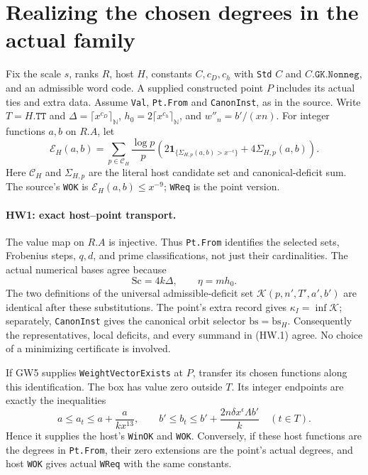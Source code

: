 \section{Realizing the chosen degrees in the actual family}
\label{sec:host-weight-join}


Fix the scale $s$, ranks $R$, host $H$, constants $C,c_D,c_h$ with
\texttt{Std} $C$ and $C.\texttt{GK.Nonneg}$, and an
admissible word code. A supplied constructed point $P$ includes its actual
ties and extra data. Assume \texttt{Val}, \texttt{Pt.From} and
\texttt{CanonInst}, as in the source. Write $T=H.\texttt{TT}$ and
$\Delta=\lceil x^{c_D}\rceil_{\mathbb N}$,
$h_0=2\lceil x^{c_h}\rceil_{\mathbb N}$, and $w''_n=b'/(xn)$.
For integer functions $a,b$ on $R.A$, let
\[
 \mathcal E_H(a,b)=
 \sum_{p\in\mathcal C_H}\frac{\log p}{p}
 \left(2\mathbf1_{\{\Sigma_{H,p}(a,b)>x^{-\epsilon}\}}
       +4\Sigma_{H,p}(a,b)\right).                 \tag{HW.1}
\]
Here $\mathcal C_H$ and $\Sigma_{H,p}$ are the literal host candidate
set and canonical-deficit sum. The source's \texttt{WOK} is
$\mathcal E_H(a,b)\le x^{-9}$; \texttt{WReq} is the point version.

\paragraph{HW1: exact host--point transport.}
The value map on $R.A$ is injective. Thus \texttt{Pt.From} identifies
the selected sets, Frobenius steps, $q,d$, and prime classifications,
not just their cardinalities. The actual numerical bases agree because
\[
 \mathrm{Sc}=4k\Delta,\qquad \eta=mh_0.             \tag{HW.2}
\]
The two definitions of the universal admissible-deficit set
$\mathcal K(p,n',T',a',b')$ are identical after these substitutions.
The point's extra record gives
$\kappa_I=\inf\mathcal K$; separately, \texttt{CanonInst} gives the
canonical orbit selector $\mathrm{bs}=\mathrm{bs}_H$.
Consequently the representatives, local deficits, and every summand in
(HW.1) agree. No choice of a minimizing certificate is involved.

If GW5 supplies \texttt{WeightVectorExists} at $P$, transfer its chosen
functions along this identification. The box has value zero outside
$T$. Its integer endpoints are exactly the inequalities
\[
 a\le a_t\le a+\frac{a}{kx^{13}},\qquad
 b'\le b_t\le b'+\frac{2n\delta x^\epsilon\Lambda b'}k
 \quad(t\in T).                                  \tag{HW.3}
\]
Hence it supplies the host's \texttt{WinOK} and \texttt{WOK}.
Conversely, if these host functions are the degrees in
\texttt{Pt.From}, their zero extensions are the point's actual degrees,
and host \texttt{WOK} gives actual \texttt{WReq} with the same constants.

